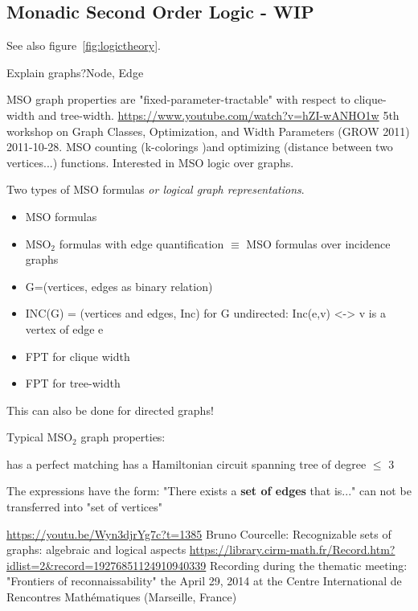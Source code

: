 \documentclass[a4paper, 12pt, bibliography=totoc]{scrartcl}
\begin{document}
\subsection{Monadic Second Order Logic - WIP}
See also figure~\ref{fig:logictheory}.

Explain graphs?Node, Edge

MSO graph properties are "fixed-parameter-tractable" with respect to clique-width and tree-width. 
\url{https://www.youtube.com/watch?v=hZI-wANHO1w} 5th workshop on Graph Classes, Optimization, and Width Parameters (GROW 2011)
2011-10-28.
MSO counting (k-colorings )and optimizing (distance between two vertices...) functions.
Interested in MSO logic over graphs.

Two types of MSO formulas \textit{or logical graph representations}.
\begin{itemize}
	\item MSO formulas
	\item MSO$_{2}$ formulas with edge quantification $\equiv$ MSO formulas over incidence graphs
\end{itemize}
\begin{itemize}
	\item G=(vertices, edges as binary relation)
	\item INC(G) = (vertices and edges, Inc)
		for G undirected: Inc(e,v) <-> v is a vertex of edge e
\end{itemize}
\begin{itemize}
	\item FPT for clique width
	\item FPT for tree-width
\end{itemize}
This can also be done for directed graphs!

Typical MSO$_{2}$ graph properties:

has a perfect matching
has a Hamiltonian circuit
spanning tree of degree $\le$ 3

The expressions have the form: "There exists a \textbf{set of edges} that is..." can not be transferred into "set of vertices"

\url{https://youtu.be/Wyn3djrYg7c?t=1385} Bruno Courcelle: Recognizable sets of graphs: algebraic and logical aspects 
\url{https://library.cirm-math.fr/Record.htm?idlist=2&record=19276851124910940339}
Recording during the thematic meeting: "Frontiers of reconnaissability" the April 29, 2014 at the Centre International de Rencontres Mathématiques (Marseille, France)
\end{document}
